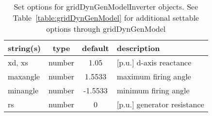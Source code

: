 \begin{table}[ht]
\centering
\begin{tabular}{p{5cm} c c p{7cm}}
\hline
string(s) & type & default & description \\
\hline
xd, xs & number & 1.05 & [p.u.] d-axis reactance\\
maxangle & number & 1.5533 & maximum firing angle\\
minangle & number & -1.5533 & minimum firing angle\\
rs & number & 0 & [p.u.] generator resistance\\
\hline
\end{tabular}
\caption{Set options for gridDynGenModelInverter objects. See Table~\ref{table:gridDynGenModel} for additional settable options through gridDynGenModel}
\label{table:gridDynGenModelInverter}
\end{table}

